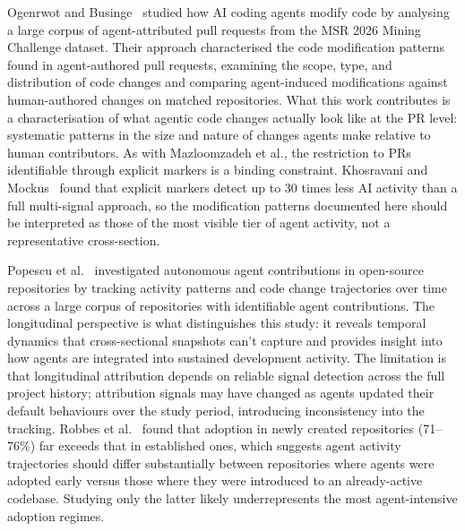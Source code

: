 Ogenrwot and Businge~\cite{ogenrwot2026} studied how AI coding agents modify code
by analysing a large corpus of agent-attributed pull requests from the MSR 2026
Mining Challenge dataset. Their approach characterised the code modification patterns
found in agent-authored pull requests, examining the scope, type, and distribution
of code changes and comparing agent-induced modifications against human-authored
changes on matched repositories. What this work contributes is a characterisation
of what agentic code changes actually look like at the PR level: systematic patterns
in the size and nature of changes agents make relative to human contributors. As
with Mazloomzadeh et al., the restriction to PRs identifiable through explicit markers
is a binding constraint. Khosravani and Mockus~\cite{khosravani2026} found that
explicit markers detect up to 30 times less AI activity than a full multi-signal
approach, so the modification patterns documented here should be interpreted as
those of the most visible tier of agent activity, not a representative cross-section.

Popescu et al.~\cite{popescu2026} investigated autonomous agent contributions in
open-source repositories by tracking activity patterns and code change trajectories
over time across a large corpus of repositories with identifiable agent contributions.
The longitudinal perspective is what distinguishes this study: it reveals temporal
dynamics that cross-sectional snapshots can't capture and provides insight into how
agents are integrated into sustained development activity. The limitation is that
longitudinal attribution depends on reliable signal detection across the full project
history; attribution signals may have changed as agents updated their default
behaviours over the study period, introducing inconsistency into the tracking.
Robbes et al.~\cite{robbesAgenticVery2026} found that adoption in newly created
repositories (71--76\%) far exceeds that in established ones, which suggests agent
activity trajectories should differ substantially between repositories where agents
were adopted early versus those where they were introduced to an already-active
codebase. Studying only the latter likely underrepresents the most agent-intensive
adoption regimes.

